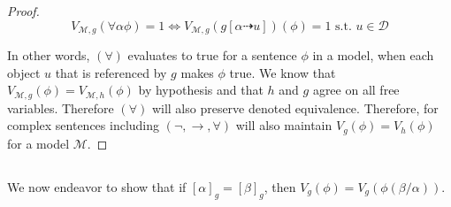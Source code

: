 \documentclass{article}
\begin{document}
\begin{proof}
        $$V_{\mathscr{M}, g}(\forall\alpha \phi) = 1 \iff V_{\mathscr{M}, g} (g[\alpha \dashrightarrow u] )(\phi) = 1 \text{ s.t. } u \in \mathscr{D}$$

        In other words, $(\forall)$ evaluates to true for a sentence $\phi$ in a model, when each object $u$ that is referenced by $g$ makes $\phi$ true.
        We know that $V_{\mathscr{M}, g}(\phi)  = V_{\mathscr{M}, h}(\phi)$ by hypothesis and that $h$ and $g$ agree on all free variables. Therefore $(\forall)$ will also preserve denoted equivalence.
        Therefore, for complex sentences including $(\lnot, \rightarrow, \forall)$ will also maintain $V_g (\phi) = V_h (\phi)$ for a model $\mathscr{M}$.
    \end{proof}

    \subsection{}
    We now endeavor to show that if $[\alpha]_g = [\beta]_g$, then $V_g(\phi) = V_g(\phi(\beta / \alpha))$.
\end{document}
